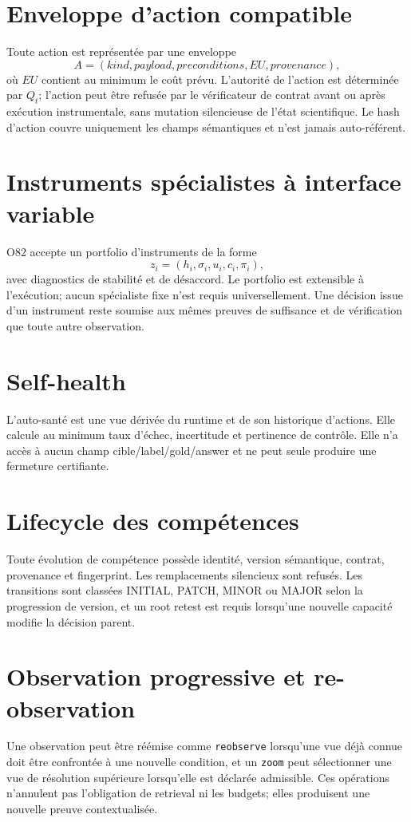 \documentclass[11pt,a4paper]{report}
\begin{document}
\section{Enveloppe d'action compatible}
Toute action est représentée par une enveloppe
\[
A=(kind,payload,preconditions,EU,provenance),
\]
où $EU$ contient au minimum le coût prévu. L'autorité de l'action est déterminée par $Q_t$; l'action peut être refusée par le vérificateur de contrat avant ou après exécution instrumentale, sans mutation silencieuse de l'état scientifique. Le hash d'action couvre uniquement les champs sémantiques et n'est jamais auto-référent.

\section{Instruments spécialistes à interface variable}
O82 accepte un portfolio d'instruments de la forme
\[
z_i=(h_i,\sigma_i,u_i,c_i,\pi_i),
\]
avec diagnostics de stabilité et de désaccord. Le portfolio est extensible à l'exécution; aucun spécialiste fixe n'est requis universellement. Une décision issue d'un instrument reste soumise aux mêmes preuves de suffisance et de vérification que toute autre observation.

\section{Self-health}
L'auto-santé est une vue dérivée du runtime et de son historique d'actions. Elle calcule au minimum taux d'échec, incertitude et pertinence de contrôle. Elle n'a accès à aucun champ cible/label/gold/answer et ne peut seule produire une fermeture certifiante.

\section{Lifecycle des compétences}
Toute évolution de compétence possède identité, version sémantique, contrat, provenance et fingerprint. Les remplacements silencieux sont refusés. Les transitions sont classées INITIAL, PATCH, MINOR ou MAJOR selon la progression de version, et un root retest est requis lorsqu'une nouvelle capacité modifie la décision parent.

\section{Observation progressive et re-observation}
Une observation peut être réémise comme \texttt{reobserve} lorsqu'une vue déjà connue doit être confrontée à une nouvelle condition, et un \texttt{zoom} peut sélectionner une vue de résolution supérieure lorsqu'elle est déclarée admissible. Ces opérations n'annulent pas l'obligation de retrieval ni les budgets; elles produisent une nouvelle preuve contextualisée.
\end{document}
